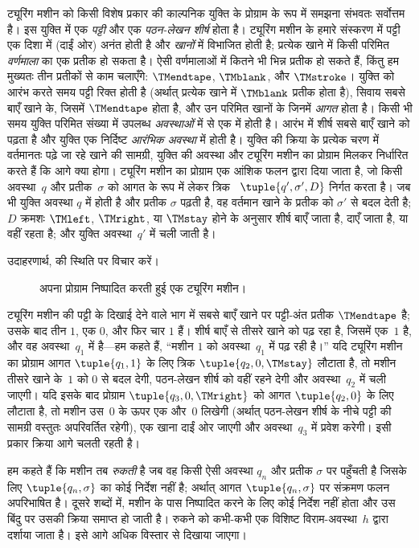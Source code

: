 \documentclass[../../../include/open-logic-section]{subfiles}
\begin{document}
\begin{explain}
ट्यूरिंग मशीन को किसी विशेष प्रकार की काल्पनिक युक्ति के प्रोग्राम के
रूप में समझना संभवतः सर्वोत्तम है। इस युक्ति में एक \emph{पट्टी} और एक
\emph{पठन-लेखन शीर्ष} होता है। ट्यूरिंग मशीन के हमारे संस्करण में पट्टी
एक दिशा में (दाईं ओर) अनंत होती है और \emph{खानों} में विभाजित होती है;
प्रत्येक खाने में किसी परिमित \emph{वर्णमाला} का एक प्रतीक हो सकता है।
ऐसी वर्णमालाओं में कितने भी भिन्न प्रतीक हो सकते हैं, किंतु हम मुख्यतः
तीन प्रतीकों से काम चलाएँगे: $\TMendtape$, $\TMblank$, और $\TMstroke$।
युक्ति को आरंभ करते समय पट्टी रिक्त होती है (अर्थात् प्रत्येक खाने में
$\TMblank$ प्रतीक होता है), सिवाय सबसे बाएँ खाने के, जिसमें
$\TMendtape$ होता है, और उन परिमित खानों के जिनमें \emph{आगत} होता है।
किसी भी समय युक्ति परिमित संख्या में उपलब्ध \emph{अवस्थाओं} में से एक
में होती है। आरंभ में शीर्ष सबसे बाएँ खाने को पढ़ता है और युक्ति एक
निर्दिष्ट \emph{आरंभिक अवस्था} में होती है। युक्ति की क्रिया के प्रत्येक
चरण में वर्तमानतः पढ़े जा रहे खाने की सामग्री, युक्ति की अवस्था और
ट्यूरिंग मशीन का प्रोग्राम मिलकर निर्धारित करते हैं कि आगे क्या होगा।
ट्यूरिंग मशीन का प्रोग्राम एक आंशिक फलन द्वारा दिया जाता है, जो किसी
अवस्था~$q$ और प्रतीक~$\sigma$ को आगत के रूप में लेकर त्रिक
~$\tuple{q', \sigma',
  D}$ निर्गत करता है। जब भी युक्ति अवस्था $q$ में
होती है और प्रतीक $\sigma$ पढ़ती है, वह वर्तमान खाने के प्रतीक को
$\sigma'$ से बदल देती है; $D$ क्रमशः $\TMleft$, $\TMright$, या
$\TMstay$ होने के अनुसार शीर्ष बाएँ जाता है, दाएँ जाता है, या वहीं रहता
है; और युक्ति अवस्था~$q'$ में चली जाती है।

उदाहरणार्थ,  की स्थिति पर विचार करें।
\begin{figure}
  \caption{अपना प्रोग्राम निष्पादित करती हुई एक ट्यूरिंग मशीन।}
\end{figure}
ट्यूरिंग मशीन की पट्टी के दिखाई देने वाले भाग में सबसे बाएँ खाने पर
पट्टी-अंत प्रतीक $\TMendtape$ है; उसके बाद तीन $1$, एक $0$, और फिर चार
$1$ हैं। शीर्ष बाएँ से तीसरे खाने को पढ़ रहा है, जिसमें एक~$1$ है, और
वह अवस्था~$q_1$ में है---हम कहते हैं, ``मशीन $1$ को अवस्था~$q_1$ में पढ़
रही है।'' यदि ट्यूरिंग मशीन का प्रोग्राम आगत $\tuple{q_1, 1}$ के लिए
त्रिक $\tuple{q_2,
0, \TMstay}$ लौटाता है, तो मशीन तीसरे खाने के~$1$ को
$0$ से बदल देगी, पठन-लेखन शीर्ष को वहीं रहने देगी और अवस्था~$q_2$ में
चली जाएगी। यदि इसके बाद प्रोग्राम $\tuple{q_3, 0, \TMright}$ को आगत
$\tuple{q_2, 0}$ के लिए लौटाता है, तो मशीन उस~$0$ के ऊपर एक और~$0$
लिखेगी (अर्थात् पठन-लेखन शीर्ष के नीचे पट्टी की सामग्री वस्तुतः अपरिवर्तित
रहेगी), एक खाना दाईं ओर जाएगी और अवस्था~$q_3$ में प्रवेश करेगी। इसी प्रकार
क्रिया आगे चलती रहती है।

हम कहते हैं कि मशीन तब \emph{रुकती} है जब वह किसी ऐसी अवस्था $q_n$ और
प्रतीक $\sigma$ पर पहुँचती है जिसके लिए $\tuple{q_n, \sigma}$ का कोई
निर्देश नहीं है; अर्थात् आगत $\tuple{q_n,\sigma}$ पर संक्रमण फलन
अपरिभाषित है। दूसरे शब्दों में, मशीन के पास निष्पादित करने के लिए कोई
निर्देश नहीं होता और उस बिंदु पर उसकी क्रिया समाप्त हो जाती है। रुकने को
कभी-कभी एक विशिष्ट विराम-अवस्था~$h$ द्वारा दर्शाया जाता है। इसे आगे अधिक
विस्तार से दिखाया जाएगा।
\end{explain}
\end{document}
